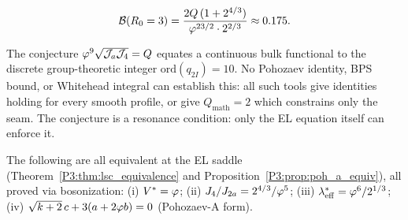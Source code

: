 \begin{equation}
  \mathcal{B}(R_0=3) = \frac{2Q\,(1+2^{4/3})}{\varphi^{23/2}\cdot 2^{2/3}} \approx 0.175.
  \label{P3:eq:B_required}
\end{equation}

\begin{remark}
\label{P3:rem:resonance}
The conjecture $\varphi^9\sqrt{\mathcal{J}_a\mathcal{J}_4}=Q$ equates a continuous bulk functional
to the discrete group-theoretic integer $\mathrm{ord}(q_{2I})=10$.
No Pohozaev identity, BPS bound, or Whitehead integral can establish this:
all such tools give identities holding for every smooth profile, or give
$Q_{\mathrm{math}}=2$ which constrains only the seam.
The conjecture is a resonance condition: only the EL equation itself can
enforce it.
\end{remark}

\begin{remark}
\label{P3:rem:five_forms}
The following are all equivalent at the EL saddle (Theorem~\ref{P3:thm:lsc_equivalence}
and Proposition~\ref{P3:prop:poh_a_equiv}), all proved via bosonization:
(i) $V^*=\varphi$; (ii) $J_4/J_{2a}=2^{4/3}/\varphi^5$; (iii) $\lambda_{\mathrm{eff}}^*=\varphi^6/2^{1/3}$;
(iv) $\sqrt{k+2}\,c+3(a+2\varphi b)=0$ (Pohozaev-A form).
\end{remark}
